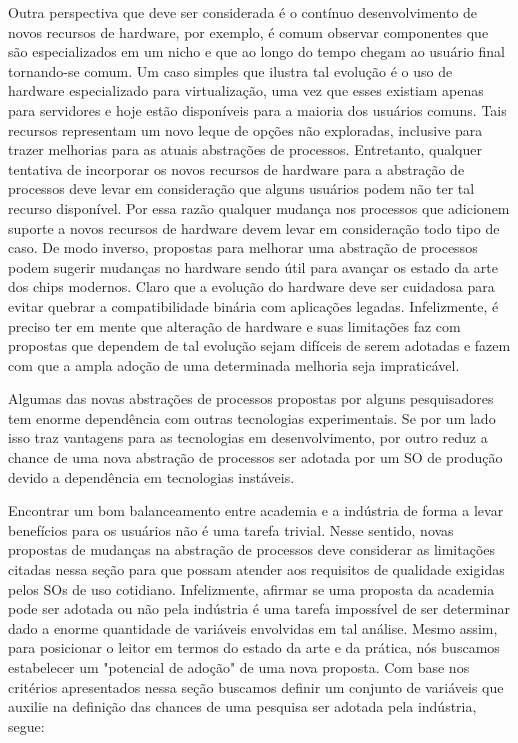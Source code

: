 Outra perspectiva que deve ser considerada é o contínuo desenvolvimento de novos
recursos de hardware, por exemplo, é comum observar componentes que
são especializados em um nicho e que ao longo do tempo chegam ao usuário
final tornando-se comum. Um caso simples que ilustra tal evolução é o
uso de hardware especializado para virtualização, uma vez que esses existiam
apenas para servidores e hoje estão disponíveis para a maioria dos usuários
comuns. Tais recursos representam um novo leque de opções não exploradas,
inclusive para trazer melhorias para as atuais abstrações de processos.
Entretanto, qualquer tentativa de incorporar os novos recursos de hardware para
a abstração de processos deve levar em consideração que alguns usuários podem
não ter tal recurso disponível. Por essa razão qualquer mudança nos processos
que adicionem suporte a novos recursos de hardware devem levar em consideração
todo tipo de caso. De modo inverso, propostas para melhorar uma abstração de
processos podem sugerir mudanças no hardware sendo útil para avançar os
estado da arte dos chips modernos. Claro que a evolução do hardware deve ser
cuidadosa para evitar quebrar a compatibilidade binária com aplicações legadas.
Infelizmente, é preciso ter em mente que alteração de hardware e suas
limitações faz com propostas que dependem de tal evolução sejam difíceis de
serem adotadas e fazem com que a ampla adoção de uma determinada melhoria seja
impraticável.

Algumas das novas abstrações de processos propostas por alguns pesquisadores
tem enorme dependência com outras tecnologias experimentais. Se por um lado
isso traz vantagens para as tecnologias em desenvolvimento, por outro reduz a
chance de uma nova abstração de processos ser adotada por um SO de produção
devido a dependência em tecnologias instáveis.

Encontrar um bom balanceamento entre academia e a indústria de forma a levar
benefícios para os usuários não é uma tarefa trivial. Nesse sentido, novas
propostas de mudanças na abstração de processos deve considerar as limitações
citadas nessa seção para que possam atender aos requisitos de qualidade
exigidas pelos SOs de uso cotidiano. Infelizmente, afirmar se uma proposta da
academia pode ser adotada ou não pela indústria é uma tarefa impossível de ser
determinar dado a enorme quantidade de variáveis envolvidas em tal análise.
Mesmo assim, para posicionar o leitor em termos do estado da arte e da prática, nós
buscamos estabelecer um "potencial de adoção" de uma nova proposta. Com base
nos critérios apresentados nessa seção buscamos definir um conjunto de
variáveis que auxilie na definição das chances de uma pesquisa ser adotada pela
indústria, segue:

